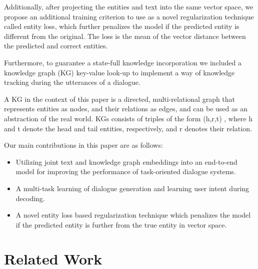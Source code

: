 \documentclass[runningheads]{llncs}
\begin{document}
Additionally, after projecting the entities and text into the same vector space, we propose an additional training criterion to use as a novel regularization technique called entity loss, which further penalizes the model if the predicted entity is different from the original. The loss is the mean of the vector distance between the predicted and correct entities. 





Furthermore, to guarantee a state-full knowledge incorporation we included a knowledge graph (KG) key-value look-up to implement a way of knowledge tracking during the utterances of a dialogue.

A KG in the context of this paper is a directed, multi-relational graph that represents entities as nodes, and their relations as edges, and can be used as an abstraction of the real world. KGs consists of triples of the form (h,r,t) , where h and t denote the head and tail entities, respectively, and r denotes their relation.

\noindent
Our main contributions in this paper are as follows:

\begin{itemize}
    \item Utilizing joint text and knowledge graph embeddings into an end-to-end model for improving the performance of task-oriented dialogue systems.
    \item A multi-task learning of dialogue generation and learning user intent during decoding.
    \item A novel entity loss based regularization technique which penalizes the model if the predicted entity is further from the true entity in vector space.
\end{itemize}




\section{Related Work}
\end{document}
